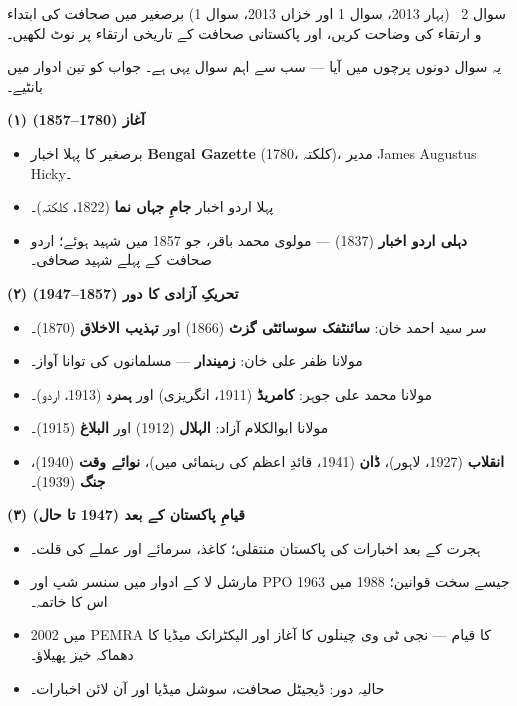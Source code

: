 \begin{sawal}{سوال \textenglish{2} \ \textnormal{\small(بہار \textenglish{2013}، سوال \textenglish{1} اور خزاں \textenglish{2013}، سوال \textenglish{1})}}
برصغیر میں صحافت کی ابتداء و ارتقاء کی وضاحت کریں، اور پاکستانی صحافت کے
تاریخی ارتقاء پر نوٹ لکھیں۔
\end{sawal}

\begin{hal}
یہ سوال دونوں پرچوں میں آیا --- سب سے اہم سوال یہی ہے۔ جواب کو تین ادوار میں
بانٹیے۔

\medskip
\textbf{(۱) آغاز (\textenglish{1780--1857})}
\begin{itemize}\setlength{\itemsep}{1pt}
  \item برصغیر کا پہلا اخبار \textbf{\textenglish{Bengal Gazette}}
        (\textenglish{1780}، کلکتہ)، مدیر \textenglish{James Augustus Hicky}۔
  \item پہلا اردو اخبار \textbf{جامِ جہاں نما} (\textenglish{1822}، کلکتہ)۔
  \item \textbf{دہلی اردو اخبار} (\textenglish{1837}) --- مولوی محمد باقر، جو
        \textenglish{1857} میں شہید ہوئے؛ اردو صحافت کے پہلے شہید صحافی۔
\end{itemize}

\textbf{(۲) تحریکِ آزادی کا دور (\textenglish{1857--1947})}
\begin{itemize}\setlength{\itemsep}{1pt}
  \item سر سید احمد خان: \textbf{سائنٹفک سوسائٹی گزٹ} (\textenglish{1866}) اور
        \textbf{تہذیب الاخلاق} (\textenglish{1870})۔
  \item مولانا ظفر علی خان: \textbf{زمیندار} --- مسلمانوں کی توانا آواز۔
  \item مولانا محمد علی جوہر: \textbf{کامریڈ} (\textenglish{1911}، انگریزی) اور
        \textbf{ہمدرد} (\textenglish{1913}، اردو)۔
  \item مولانا ابوالکلام آزاد: \textbf{الہلال} (\textenglish{1912}) اور
        \textbf{البلاغ} (\textenglish{1915})۔
  \item \textbf{انقلاب} (\textenglish{1927}، لاہور)، \textbf{ڈان}
        (\textenglish{1941}، قائدِ اعظم کی رہنمائی میں)، \textbf{نوائے وقت}
        (\textenglish{1940})، \textbf{جنگ} (\textenglish{1939})۔
\end{itemize}

\textbf{(۳) قیامِ پاکستان کے بعد (\textenglish{1947} تا حال)}
\begin{itemize}\setlength{\itemsep}{1pt}
  \item ہجرت کے بعد اخبارات کی پاکستان منتقلی؛ کاغذ، سرمائے اور عملے کی قلت۔
  \item مارشل لا کے ادوار میں سنسر شپ اور \textenglish{PPO 1963} جیسے سخت
        قوانین؛ \textenglish{1988} میں اس کا خاتمہ۔
  \item \textenglish{2002} میں \textenglish{PEMRA} کا قیام --- نجی ٹی وی چینلوں
        کا آغاز اور الیکٹرانک میڈیا کا دھماکہ خیز پھیلاؤ۔
  \item حالیہ دور: ڈیجیٹل صحافت، سوشل میڈیا اور آن لائن اخبارات۔
\end{itemize}


\end{hal}
